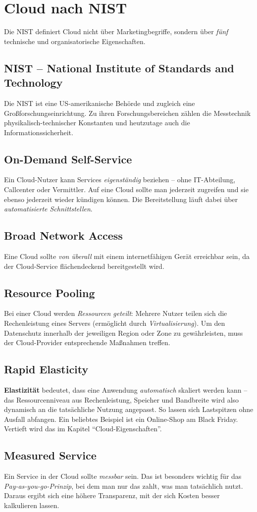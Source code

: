 \section{Cloud nach NIST}
Die NIST definiert Cloud nicht über Marketingbegriffe, sondern über \emph{fünf}
technische und organisatorische Eigenschaften.
\subsection{NIST – National Institute of Standards and Technology}
Die NIST ist eine US-amerikanische Behörde und zugleich eine
Großforschungseinrichtung. Zu ihren Forschungsbereichen zählen die Messtechnik
physikalisch-technischer Konstanten und heutzutage auch die
Informationssicherheit.
\subsection{On-Demand Self-Service}
Ein Cloud-Nutzer kann Services \emph{eigenständig} beziehen – ohne IT-Abteilung,
Callcenter oder Vermittler. Auf eine Cloud sollte man jederzeit zugreifen und
sie ebenso jederzeit wieder kündigen können. Die Bereitstellung läuft dabei
über \emph{automatisierte Schnittstellen}.
\subsection{Broad Network Access}
Eine Cloud sollte \emph{von überall} mit einem internetfähigen Gerät erreichbar sein,
da der Cloud-Service flächendeckend bereitgestellt wird.
\subsection{Resource Pooling}
Bei einer Cloud werden \emph{Ressourcen geteilt}: Mehrere Nutzer teilen sich die
Rechenleistung eines Servers (ermöglicht durch \textit{Virtualisierung}). Um den
Datenschutz innerhalb der jeweiligen Region oder Zone zu gewährleisten, muss
der Cloud-Provider entsprechende Maßnahmen treffen.
\subsection{Rapid Elasticity}
\textbf{Elastizität} bedeutet, dass eine Anwendung \emph{automatisch} skaliert werden kann –
das Ressourcenniveau aus Rechenleistung, Speicher und Bandbreite wird also
dynamisch an die tatsächliche Nutzung angepasst. So lassen sich Lastspitzen
ohne Ausfall abfangen. Ein beliebtes Beispiel ist ein Online-Shop am Black
Friday. Vertieft wird das im Kapitel \enquote{Cloud-Eigenschaften}.
\subsection{Measured Service}
Ein Service in der Cloud sollte \emph{messbar} sein. Das ist besonders wichtig für das
\textit{Pay-as-you-go-Prinzip}, bei dem man nur das zahlt, was man tatsächlich nutzt.
Daraus ergibt sich eine höhere Transparenz, mit der sich Kosten besser
kalkulieren lassen.
